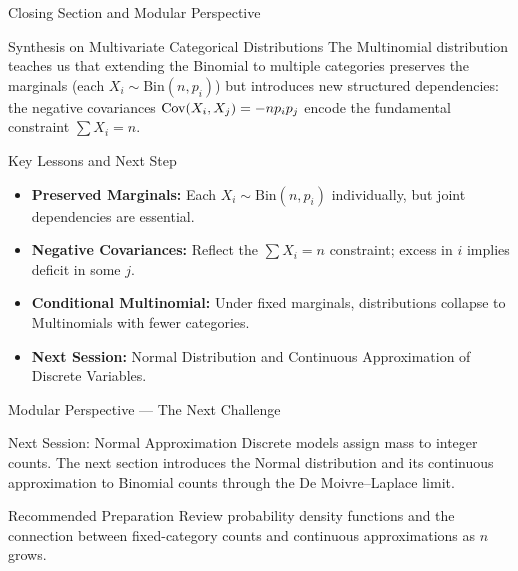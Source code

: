 \documentclass[aspectratio=169,xcolor={dvipsnames,table}]{beamer}
\begin{document}
\begin{frame}{Closing Section and Modular Perspective}
	\vspace{-0.15cm}
	\begin{block}{Synthesis on Multivariate Categorical Distributions}
		\scriptsize
		The Multinomial distribution teaches us that extending the Binomial to multiple categories preserves the marginals (each $X_{i} \sim \text{Bin}(n, p_{i})$) but introduces new structured dependencies: the negative covariances $\operatorname{Cov}(X_{i}, X_{j}) = -n p_{i} p_{j}$ encode the fundamental constraint $\sum X_{i} = n$.
	\end{block}
	\vspace{0.05cm}
	\pause
	\begin{alertblock}{Key Lessons and Next Step}
		\begin{itemize}\itemsep=0.05cm
			\item \textbf{Preserved Marginals:} Each $X_{i} \sim \text{Bin}(n, p_{i})$ individually, but joint dependencies are essential.
			\item \textbf{Negative Covariances:} Reflect the $\sum X_{i} = n$ constraint; excess in $i$ implies deficit in some $j$.
			\item \textbf{Conditional Multinomial:} Under fixed marginals, distributions collapse to Multinomials with fewer categories.
			\item \textbf{Next Session:} \textcolor{TecRojo}{Normal Distribution and Continuous Approximation of Discrete Variables}.
		\end{itemize}
	\end{alertblock}
\end{frame}

\begin{frame}{Modular Perspective --- The Next Challenge}
\scriptsize
\begin{alertblock}{Next Session: Normal Approximation}
Discrete models assign mass to integer counts. The next section introduces the
Normal distribution and its continuous approximation to Binomial counts through
the De Moivre--Laplace limit.
\end{alertblock}
\vspace{0.08cm}
\begin{block}{Recommended Preparation}
Review probability density functions and the connection between fixed-category
counts and continuous approximations as $n$ grows.
\end{block}
\end{frame}
\end{document}
